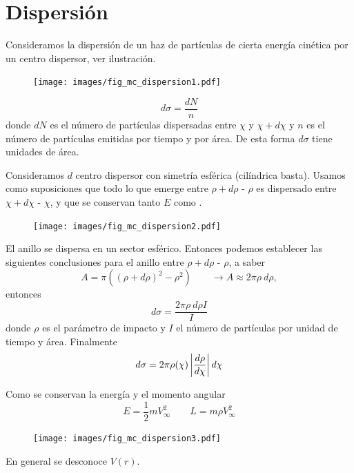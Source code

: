 \documentclass[10pt,oneside]{CBFT_book}
\begin{document}
\section{Dispersión}

Consideramos la dispersión de un haz de partículas de cierta energía cinética por un centro dispersor,
ver ilustración.

\begin{figure}[htb]
	\begin{center}
	\texttt{[image: images/fig\_mc\_dispersion1.pdf]}	 
	\end{center}
	\caption{}
\end{figure} 
\[
	d\sigma = \frac{dN}{n}
\]
donde $dN$ es el número de partículas dispersadas entre $\chi$ y $\chi + d\chi$ y $n$ es el número de
partículas emitidas por tiempo y por área. De esta forma $d\sigma$ tiene unidades de área.

Consideramos $d$ centro dispersor con simetría esférica (cilíndrica basta).
Usamos como suposiciones que todo lo que emerge entre $\rho + d\rho$ - $\rho$  es dispersado entre
$\chi + d\chi$ - $\chi$, y que se conservan tanto $E$ como .

\begin{figure}[htb]
	\begin{center}
	\texttt{[image: images/fig\_mc\_dispersion2.pdf]}	 
	\end{center}
	\caption{}
\end{figure}

El anillo se dispersa en un sector esférico. Entonces podemos establecer las siguientes conclusiones
para el anillo entre $\rho + d\rho$ - $\rho$, a saber
\[
	A =  \pi ( (\rho + d\rho)^2 - \rho^2 ) \qquad \longrightarrow A \approx 2 \pi \rho \: d\rho,
\]
entonces
\[
	d\sigma = \frac{  2 \pi \rho \: d\rho I}{I}
\]
donde $\rho$ es el parámetro de impacto y $I$ el número de partículas por unidad de tiempo y área.
Finalmente
\[
	d\sigma =  2 \pi \rho(\chi) \left| \frac{d^{\hspace{-0.05em}} {\rho}}{d {\chi}^{\hspace{-0.05em}}} \right| d\chi
\]

Como se conservan la energía y el momento angular
\[
	E = \frac{1}{2} m V_\infty^2 \qquad L = m \rho V_\infty^2 
\]
\begin{figure}[htb]
	\begin{center}
	\texttt{[image: images/fig\_mc\_dispersion3.pdf]}	 
	\end{center}
	\caption{}
\end{figure}
En general se desconoce $V(r)$.
\end{document}
